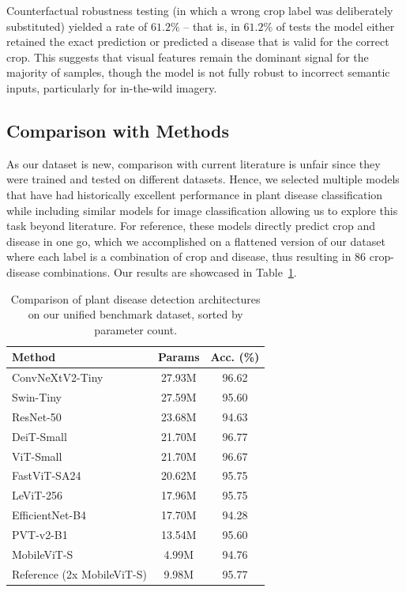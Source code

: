 \documentclass{bmvc2k}
\begin{document}
Counterfactual robustness testing (in which a wrong crop label was deliberately substituted) yielded a rate of $61.2\%$ -- that is, in $61.2\%$ of tests the model either retained the exact prediction or predicted a disease that is valid for the correct crop. This suggests that visual features remain the dominant signal for the majority of samples, though the model is not fully robust to incorrect semantic inputs, particularly for in-the-wild imagery.


\subsection{Comparison with Methods}

As our dataset is new, comparison with current literature is unfair since they were trained and tested on different datasets. Hence, we selected multiple models that have had historically excellent performance in plant disease classification~\cite{shafay2025recent, pal2025lightweight} while including similar models for image classification allowing us to explore this task beyond literature. For reference, these models directly predict crop and disease in one go, which we accomplished on a flattened version of our dataset where each label is a combination of crop and disease, thus resulting in 86 crop-disease combinations. Our results are showcased in Table~\ref{tab:wild_comparison}.

\begin{table}[h]
\centering
\caption{Comparison of plant disease detection architectures on our unified benchmark dataset, sorted by parameter count.}
\label{tab:wild_comparison}
\begin{tabular}{|l|c|c|}
\hline
\textbf{Method} & \textbf{Params} & \textbf{Acc. (\%)} \\
\hline\hline
ConvNeXtV2-Tiny~\cite{woo2023convnext} & 27.93M & 96.62 \\
Swin-Tiny~\cite{liu2021swin} & 27.59M & 95.60 \\
ResNet-50~\cite{he2016deep} & 23.68M & 94.63 \\
DeiT-Small~\cite{touvron2021training} & 21.70M & 96.77 \\
ViT-Small~\cite{dosovitskiy2020image} & 21.70M & 96.67 \\
FastViT-SA24~\cite{vasu2023fastvit} & 20.62M & 95.75 \\
LeViT-256~\cite{graham2021levit} & 17.96M & 95.75 \\
EfficientNet-B4~\cite{tan2019efficientnet} & 17.70M & 94.28 \\
PVT-v2-B1~\cite{wang2022pvt} & 13.54M & 95.60 \\
MobileViT-S~\cite{mehta2022} & 4.99M & 94.76 \\
\hline
Reference (2x MobileViT-S) & 9.98M & 95.77 \\
\hline
\end{tabular}
\end{table}
\end{document}
